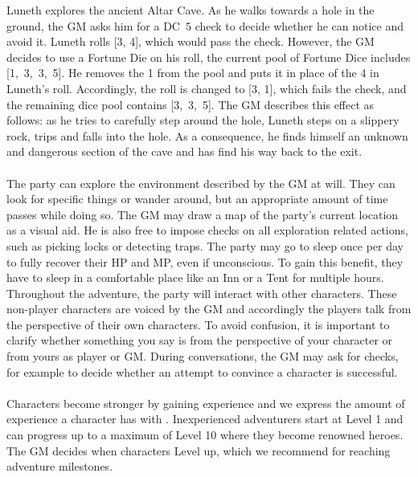 %
\ofpar
%
{
	Luneth explores the ancient Altar Cave. 
	As he walks towards a hole in the ground, the GM asks him for a DC~5 check to decide whether he can notice and avoid it.
	Luneth rolls [3, 4], which would pass the check.
	However, the GM decides to use a Fortune Die on his roll, the current pool of Fortune Dice includes \mbox{[1, 3, 3, 5]}.
	He removes the 1 from the pool and puts it in place of the 4 in Luneth's roll.  
	Accordingly, the roll is changed to [3, 1], which fails the check, and the remaining dice pool contains \mbox{[3, 3, 5]}.
	The GM describes this effect as follows: as he tries to carefully step around the hole, Luneth steps on a slippery rock, trips and falls into the hole.
	As a consequence, he finds himself an unknown and dangerous section of the cave and has find his way back to the exit.
}
%
\ofpar
%
\\\\
%
The party can explore the environment described by the GM at will.
They can look for specific things or wander around, but an appropriate amount of time passes while doing so.
The GM may draw a map of the party's current location as a visual aid. 
He is also free to impose checks on all exploration related actions, such as picking locks or detecting traps.
The party may go to sleep once per day to fully recover their HP and MP, even if unconscious.
To gain this benefit, they have to sleep in a comfortable place like an Inn or a Tent for multiple hours.
Throughout the adventure, the party will interact with other characters.
These non-player characters are voiced by the GM and accordingly the players talk from the perspective of their own characters.
To avoid confusion, it is important to clarify whether something you say is from the perspective of your character or from yours as player or GM.
During conversations, the GM may ask for checks, for example to decide whether an attempt to convince a character is successful.
%
\vfill
%
\\\\
%
Characters become stronger by gaining experience and we express the amount of experience a character has with .
Inexperienced adventurers start at Level 1 and can progress up to a maximum of Level 10 where they become renowned heroes. 
The GM decides when characters Level up, which we recommend for reaching adventure milestones.
